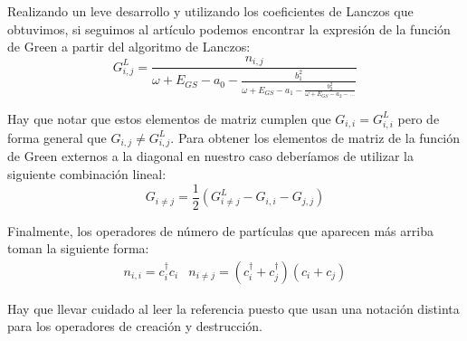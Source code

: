 \documentclass{article} %
\begin{document}
Realizando un leve desarrollo y utilizando los coeficientes de Lanczos que obtuvimos, si seguimos al artículo \cite{GreeneDiniz2024} podemos encontrar la expresión de la función de Green a partir del algoritmo de Lanczos:
\begin{equation}
    G_{i, j}^L = \frac{n_{i, j}}{\omega + E_{GS} - a_0 - \frac{b_1^2}{\omega + E_{GS} - a_1 - \frac{b_2^2}{\omega + E_{GS} - a_2 - \ldots}}}
\end{equation}

Hay que notar que estos elementos de matriz cumplen que $G_{i, i} = G_{i, i}^L$ pero  de forma general que $G_{i, j} \neq G_{i, j}^L$. Para obtener los elementos de matriz de la función de Green externos a la diagonal en nuestro caso deberíamos de utilizar la siguiente combinación lineal:
\begin{equation}
    G_{i \neq j} = \frac{1}{2}\left(G_{i \neq j}^L - G_{i, i} - G_{j, j}\right)
\end{equation}

Finalmente, los operadores de número de partículas que aparecen más arriba toman la siguiente forma:
\begin{equation}
    \begin{array}{cc}
        n_{i, i} = c_i^{\dagger}c_i & n_{i \neq j} = \left(c_i^{\dagger} + c_j^{\dagger}\right)\left(c_i + c_j\right)
    \end{array}
\end{equation}

Hay que llevar cuidado al leer la referencia \cite{GreeneDiniz2024} puesto que usan una notación distinta para los operadores de creación y destrucción.
\printbibliography
\end{document}
